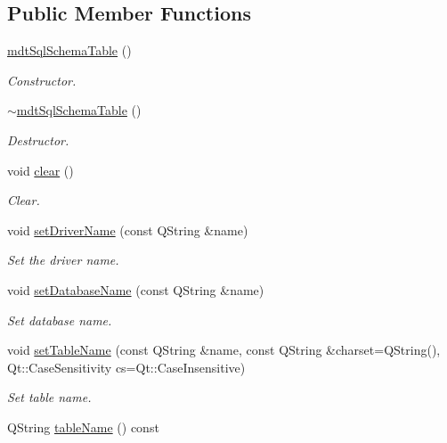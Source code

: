\subsection*{Public Member Functions}
\begin{DoxyCompactItemize}
\item 
\hyperlink{classmdt_sql_schema_table_a0f4d89a81a175e51b664de84ad39de65}{mdt\-Sql\-Schema\-Table} ()
\begin{DoxyCompactList}\small\item\em Constructor. \end{DoxyCompactList}\item 
\hyperlink{classmdt_sql_schema_table_a39be8d436117529ecdb881e0855e1403}{$\sim$mdt\-Sql\-Schema\-Table} ()
\begin{DoxyCompactList}\small\item\em Destructor. \end{DoxyCompactList}\item 
void \hyperlink{classmdt_sql_schema_table_a3ee39e0981fc152c6f811114b78068aa}{clear} ()
\begin{DoxyCompactList}\small\item\em Clear. \end{DoxyCompactList}\item 
void \hyperlink{classmdt_sql_schema_table_a3518d03c95486589222610b69abe6ee8}{set\-Driver\-Name} (const Q\-String \&name)
\begin{DoxyCompactList}\small\item\em Set the driver name. \end{DoxyCompactList}\item 
void \hyperlink{classmdt_sql_schema_table_aa9a99e27383cd6ba34231d5b2eb60dd8}{set\-Database\-Name} (const Q\-String \&name)
\begin{DoxyCompactList}\small\item\em Set database name. \end{DoxyCompactList}\item 
void \hyperlink{classmdt_sql_schema_table_a36b5b28c64ad9cfa69a65e775fc33cbd}{set\-Table\-Name} (const Q\-String \&name, const Q\-String \&charset=Q\-String(), Qt\-::\-Case\-Sensitivity cs=Qt\-::\-Case\-Insensitive)
\begin{DoxyCompactList}\small\item\em Set table name. \end{DoxyCompactList}\item 
Q\-String \hyperlink{classmdt_sql_schema_table_a24def48594abf674f96852a4c0d5e9c1}{table\-Name} () const 

\end{DoxyCompactItemize}
